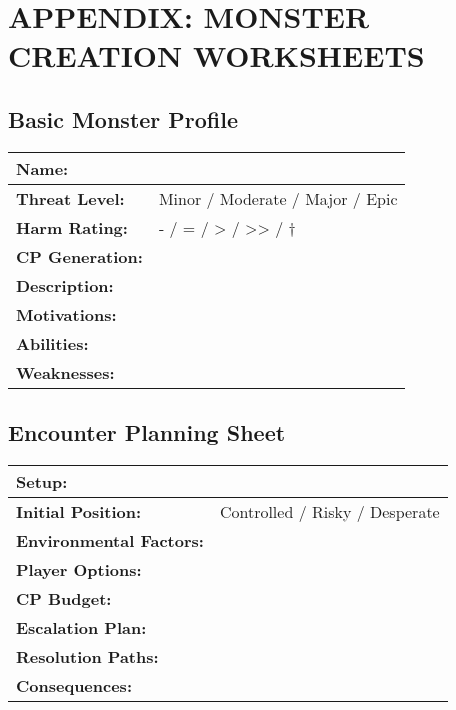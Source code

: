 \documentclass[12pt]{article}
\begin{document}

\section{APPENDIX: MONSTER CREATION WORKSHEETS}

\subsection*{Basic Monster Profile}

\begin{tabularx}{\textwidth}{|l|X|}
\hline
\textbf{Name:} & \\
\hline
\textbf{Threat Level:} & Minor / Moderate / Major / Epic \\
\hline
\textbf{Harm Rating:} & - / = / > / >> / † \\
\hline
\textbf{CP Generation:} & \\
\hline
\textbf{Description:} & \\
\hline
\textbf{Motivations:} & \\
\hline
\textbf{Abilities:} & \\
\hline
\textbf{Weaknesses:} & \\
\hline
\end{tabularx}

\subsection*{Encounter Planning Sheet}

\begin{tabularx}{\textwidth}{|l|X|}
\hline
\textbf{Setup:} & \\
\hline
\textbf{Initial Position:} & Controlled / Risky / Desperate \\
\hline
\textbf{Environmental Factors:} & \\
\hline
\textbf{Player Options:} & \\
\hline
\textbf{CP Budget:} & \\
\hline
\textbf{Escalation Plan:} & \\
\hline
\textbf{Resolution Paths:} & \\
\hline
\textbf{Consequences:} & \\
\hline
\end{tabularx}
\end{document}
